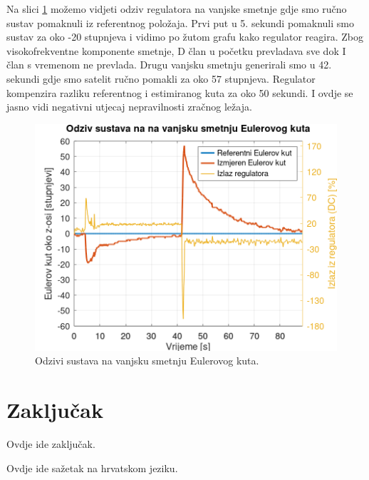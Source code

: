 \documentclass[times, utf8, diplomski, numeric]{templates/template}
\begin{document}
{{        Na slici \ref{fig:angle_reg_dist} možemo vidjeti odziv regulatora na vanjske smetnje gdje smo ručno sustav pomaknuli iz referentnog položaja. Prvi put u 5. sekundi pomaknuli smo sustav za oko -20 stupnjeva i vidimo po žutom grafu kako regulator reagira. Zbog visokofrekventne komponente smetnje, D član u početku prevladava sve dok I član s vremenom ne prevlada. Drugu vanjsku smetnju generirali smo u 42. sekundi gdje smo satelit ručno pomakli za oko 57 stupnjeva. Regulator kompenzira razliku referentnog i estimiranog kuta za oko 50 sekundi. I ovdje se jasno vidi negativni utjecaj nepravilnosti zračnog ležaja. 

        \begin{figure}[htb]
        \centering
        \includegraphics[width=1.0\textwidth]{other/angle_reg_dist.png}
        \caption{Odzivi sustava na vanjsku smetnju Eulerovog kuta.}
        \label{fig:angle_reg_dist}
        \end{figure}
    }
}

\chapter{Zaključak}{
    Ovdje ide zaključak.
}




\begin{sazetak}{
    Ovdje ide sažetak na hrvatskom jeziku.
}

\end{sazetak}

\begin{abstract}{
    Add abstract here.
}

\end{abstract}
\end{document}
